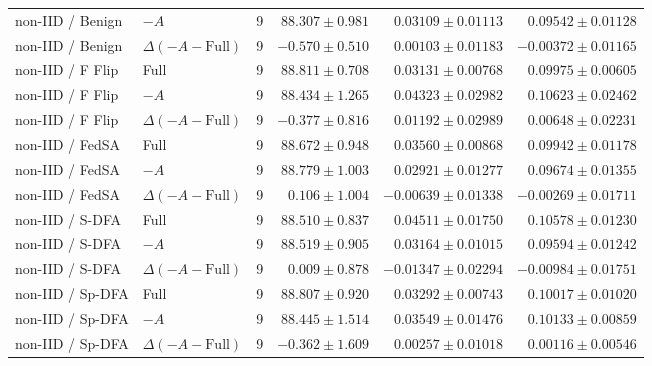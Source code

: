 \begin{table}[t]
\begin{tabular}{llrrrr}
non-IID / Benign & $-A$ & 9 & $88.307 \pm 0.981$ & $0.03109 \pm 0.01113$ & $0.09542 \pm 0.01128$ \\
non-IID / Benign & $\Delta(-A-\mathrm{Full})$ & 9 & $-0.570 \pm 0.510$ & $0.00103 \pm 0.01183$ & $-0.00372 \pm 0.01165$ \\
non-IID / F Flip & Full & 9 & $88.811 \pm 0.708$ & $0.03131 \pm 0.00768$ & $0.09975 \pm 0.00605$ \\
non-IID / F Flip & $-A$ & 9 & $88.434 \pm 1.265$ & $0.04323 \pm 0.02982$ & $0.10623 \pm 0.02462$ \\
non-IID / F Flip & $\Delta(-A-\mathrm{Full})$ & 9 & $-0.377 \pm 0.816$ & $0.01192 \pm 0.02989$ & $0.00648 \pm 0.02231$ \\
non-IID / FedSA & Full & 9 & $88.672 \pm 0.948$ & $0.03560 \pm 0.00868$ & $0.09942 \pm 0.01178$ \\
non-IID / FedSA & $-A$ & 9 & $88.779 \pm 1.003$ & $0.02921 \pm 0.01277$ & $0.09674 \pm 0.01355$ \\
non-IID / FedSA & $\Delta(-A-\mathrm{Full})$ & 9 & $0.106 \pm 1.004$ & $-0.00639 \pm 0.01338$ & $-0.00269 \pm 0.01711$ \\
non-IID / S-DFA & Full & 9 & $88.510 \pm 0.837$ & $0.04511 \pm 0.01750$ & $0.10578 \pm 0.01230$ \\
non-IID / S-DFA & $-A$ & 9 & $88.519 \pm 0.905$ & $0.03164 \pm 0.01015$ & $0.09594 \pm 0.01242$ \\
non-IID / S-DFA & $\Delta(-A-\mathrm{Full})$ & 9 & $0.009 \pm 0.878$ & $-0.01347 \pm 0.02294$ & $-0.00984 \pm 0.01751$ \\
non-IID / Sp-DFA & Full & 9 & $88.807 \pm 0.920$ & $0.03292 \pm 0.00743$ & $0.10017 \pm 0.01020$ \\
non-IID / Sp-DFA & $-A$ & 9 & $88.445 \pm 1.514$ & $0.03549 \pm 0.01476$ & $0.10133 \pm 0.00859$ \\
non-IID / Sp-DFA & $\Delta(-A-\mathrm{Full})$ & 9 & $-0.362 \pm 1.609$ & $0.00257 \pm 0.01018$ & $0.00116 \pm 0.00546$ \\
\bottomrule
\end{tabular}
\end{table}

